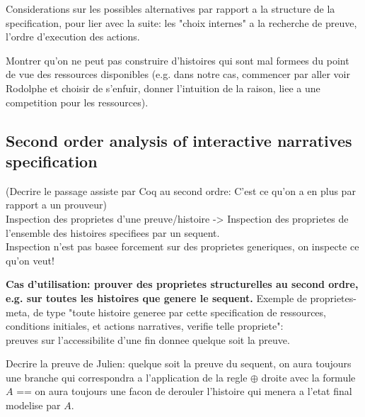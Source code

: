 \documentclass[runningheads,a4paper]{llncs}
\begin{document}
Considerations sur les possibles alternatives par rapport a la structure de la specification, pour lier avec la suite: les "choix internes" a la recherche de preuve, l'ordre d'execution des actions. 

Montrer qu'on ne peut pas construire d'histoires qui sont mal formees du point de vue des ressources disponibles (e.g. dans notre cas, commencer par aller voir Rodolphe et choisir de s'enfuir, donner l'intuition de la raison, liee a une competition pour les ressources).
\subsection{Second order analysis of interactive narratives specification}
(Decrire le passage assiste par Coq au second ordre: C'est ce qu'on a en plus par rapport a un prouveur)
\\
Inspection des proprietes d'une preuve/histoire -> Inspection des proprietes de l'ensemble des histoires specifiees par un sequent.\\
Inspection n'est pas basee forcement sur des proprietes generiques, on inspecte ce qu'on veut!

\textbf{Cas d'utilisation: prouver des proprietes structurelles au second ordre, e.g. sur toutes les histoires que genere le sequent.}
Exemple de proprietes-meta, de type "toute histoire generee par cette specification de ressources, conditions initiales, et actions narratives, verifie telle propriete":\\ preuves sur l'accessibilite d'une fin donnee quelque soit la preuve.

Decrire la preuve de Julien: quelque soit la preuve du sequent, on aura toujours une branche qui correspondra a l'application de la regle $\oplus$ droite avec la formule $A$ == on aura toujours une facon de derouler l'histoire qui menera a l'etat final modelise par $A$.
\end{document}
